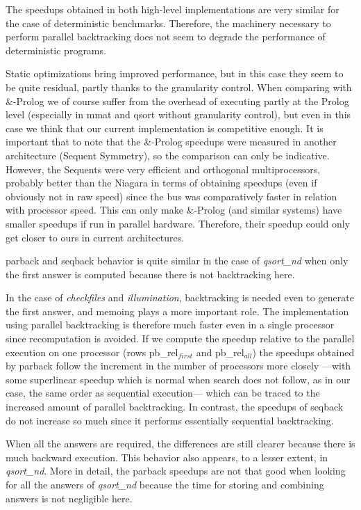 \documentclass{tlp}
\begin{document}
The speedups obtained in both high-level implementations are very
similar for the case of deterministic benchmarks.  Therefore, the
machinery necessary to perform parallel backtracking does not seem to
degrade the performance of deterministic programs.


Static optimizations bring improved performance, but in this case they
seem to be quite residual, partly thanks to the granularity control.
When comparing with \textsf{\&-Prolog} we of course suffer from the
overhead of executing partly at the Prolog level (especially in
\textsf{mmat} and \textsf{qsort} without granularity control), but
even in this case we think that our current implementation is
competitive enough.  It is important that to note that the
\textsf{\&-Prolog} speedups were measured in another architecture
(Sequent Symmetry), so the comparison can only be indicative.
However, the Sequents were very efficient and orthogonal
multiprocessors, probably better than the Niagara in terms of
obtaining speedups (even if obviously not in raw speed) since the bus
was comparatively faster in relation with processor speed.
This
can only make \textsf{\&-Prolog} (and similar systems) have smaller
speedups if run in parallel hardware.  Therefore, their speedup could
only get closer to ours in current architectures.


\textsf{parback} and \textsf{seqback} behavior is quite similar
in the case of \emph{qsort\_nd} when only the first answer is computed
because there is not backtracking here.




In the case of \emph{checkfiles} and \emph{illumination}, backtracking
is needed even to generate the first answer, and memoing plays a
more important role.
The implementation using parallel backtracking is therefore much
faster even in a single processor since recomputation is avoided.
If we compute the speedup relative to the parallel execution on one
processor (rows \textsf{pb\_rel$_{first}$} and \textsf{pb\_rel$_{all}$})
the speedups obtained by \textsf{parback}
follow the increment in the number of processors more closely ---with
some superlinear speedup which is normal when search does not follow,
as in our case, the same order as sequential execution--- which can be
traced to the increased amount of parallel backtracking.
In contrast, the speedups of \textsf{seqback} do not increase so much
since it performs essentially
sequential backtracking.


When all the answers are required, the differences are still clearer
because there is much backward execution.
This behavior also appears, to a lesser extent, in
\emph{qsort\_nd}. More in detail, the \textsf{parback} speedups are not
that good when looking for all the answers of \emph{qsort\_nd} because
the time for storing and combining answers is not negligible here.
\end{document}
